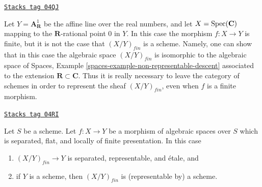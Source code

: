 \begin{remark}
\label{spaces-more-groupoids-remark-not-scheme}
\href{https://stacks.math.columbia.edu/tag/04QJ}{\texttt{Stacks tag 04QJ}}

Let $Y = \mathbf{A}^1_{\mathbf{R}}$ be the affine line over the real
numbers, and let $X = \operatorname{Spec}(\mathbf{C})$ mapping to the
$\mathbf{R}$-rational point $0$ in $Y$. In this case the morphism
$f : X \to Y$ is finite, but it is not the case that $(X/Y)_{fin}$
is a scheme. Namely, one can show that in this case the algebraic
space $(X/Y)_{fin}$ is isomorphic to the algebraic space of
Spaces, Example \ref{spaces-example-non-representable-descent}
associated to the extension $\mathbf{R} \subset \mathbf{C}$.
Thus it is really necessary to leave the category of schemes
in order to represent the sheaf $(X/Y)_{fin}$, even when $f$
is a finite morphism.
\end{remark}

\begin{lemma}
\label{spaces-more-groupoids-lemma-finite-separated-flat-locally-finite-presentation}
\href{https://stacks.math.columbia.edu/tag/04RI}{\texttt{Stacks tag 04RI}}

Let $S$ be a scheme.
Let $f : X \to Y$ be a morphism of algebraic spaces over $S$ which
is separated, flat, and locally of finite presentation.
In this case
\begin{enumerate}
\item $(X/Y)_{fin} \to Y$ is separated, representable, and \'etale, and
\item if $Y$ is a scheme, then $(X/Y)_{fin}$ is (representable by) a scheme.
\end{enumerate}
\end{lemma}

